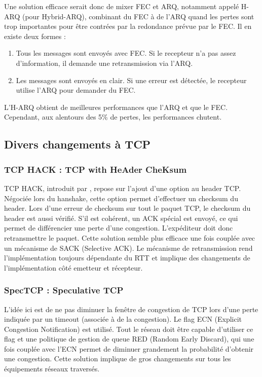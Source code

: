 \documentclass[frenchb]{article}
\begin{document}
Une solution efficace serait donc de mixer FEC et ARQ, notamment appelé H-ARQ (pour Hybrid-ARQ), combinant du FEC à de l'ARQ quand les pertes sont trop importantes pour être contrées par la redondance prévue par le FEC.
Il en existe deux formes :
\begin{enumerate}
\item Tous les messages sont envoyés avec FEC. Si le recepteur n'a pas assez d'information, il demande une retransmission via l'ARQ.
\item Les messages sont envoyés en clair. Si une erreur est détectée, le recepteur utilise l'ARQ pour demander du FEC.
\end{enumerate}
L'H-ARQ obtient de meilleures performances que l'ARQ et que le FEC. Cependant, aux alentours des 5\% de pertes, les performances chutent.


\subsection{Divers changements à TCP}
\subsubsection{TCP HACK : TCP with HeAder CheKsum}
TCP HACK, introduit par \cite{tcphack}, repose sur l'ajout d'une option au header TCP. Négociée lors du hanshake, cette option permet d'effectuer un checksum du header. Lors d'une erreur de checksum sur tout le paquet TCP, le checksum du header est aussi vérifié. S'il est cohérent, un ACK spécial est envoyé, ce qui permet de différencier une perte d'une congestion. L'expéditeur doit donc retransmettre le paquet. Cette solution semble plus efficace une fois couplée avec un mécanisme de SACK (Selective ACK). Le mécanisme de retransmission rend l'implémentation toujours dépendante du RTT et implique des changements de l'implémentation côté emetteur et récepteur.


\subsubsection{SpecTCP : Speculative TCP}
L'idée ici est de ne pas diminuer la fenêtre de congestion de TCP lors d'une perte indiquée par un timeout (associée à de la congestion). Le flag ECN (Explicit Congestion Notification) est utilisé. Tout le réseau doit être capable d'utiliser ce flag et une politique de gestion de queue RED (Random Early Discard), qui une fois couplée avec l'ECN permet de diminuer grandement la probabilité d'obtenir une congestion. Cette solution implique de gros changements sur tous les équipements réseaux traversés.
\end{document}

